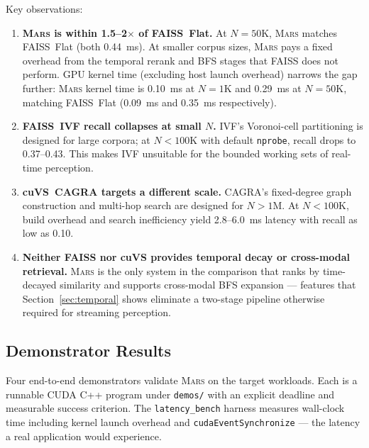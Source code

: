 \documentclass[11pt]{article}
\newcommand{\mars}{\textsc{Mars}}
\begin{document}
\noindent Key observations:

\begin{enumerate}
\item \textbf{\mars{} is within 1.5--2$\times$ of FAISS~Flat.} At
  $N{=}50$K, \mars{} matches FAISS~Flat (both 0.44~ms). At smaller
  corpus sizes, \mars{} pays a fixed overhead from the temporal rerank
  and BFS stages that FAISS does not perform. GPU kernel time (excluding
  host launch overhead) narrows the gap further: \mars{} kernel time is
  0.10~ms at $N{=}1$K and 0.29~ms at $N{=}50$K, matching FAISS~Flat
  (0.09~ms and 0.35~ms respectively).

\item \textbf{FAISS~IVF recall collapses at small $N$.} IVF's
  Voronoi-cell partitioning is designed for large corpora; at
  $N < 100$K with default \texttt{nprobe}, recall drops to 0.37--0.43.
  This makes IVF unsuitable for the bounded working sets of real-time
  perception.

\item \textbf{cuVS~CAGRA targets a different scale.} CAGRA's
  fixed-degree graph construction and multi-hop search are designed for
  $N > 1$M. At $N < 100$K, build overhead and search inefficiency
  yield 2.8--6.0~ms latency with recall as low as 0.10.

\item \textbf{Neither FAISS nor cuVS provides temporal decay or
  cross-modal retrieval.} \mars{} is the only system in the comparison
  that ranks by time-decayed similarity and supports cross-modal BFS
  expansion --- features that Section~\ref{sec:temporal} shows
  eliminate a two-stage pipeline otherwise required for streaming
  perception.
\end{enumerate}

\subsection{Demonstrator Results}
\label{sec:demos}

Four end-to-end demonstrators validate \mars{} on the target workloads.
Each is a runnable CUDA C++ program under \texttt{demos/} with an
explicit deadline and measurable success criterion. The
\texttt{latency\_bench} harness measures wall-clock time including
kernel launch overhead and \texttt{cudaEventSynchronize} --- the
latency a real application would experience.
\end{document}
